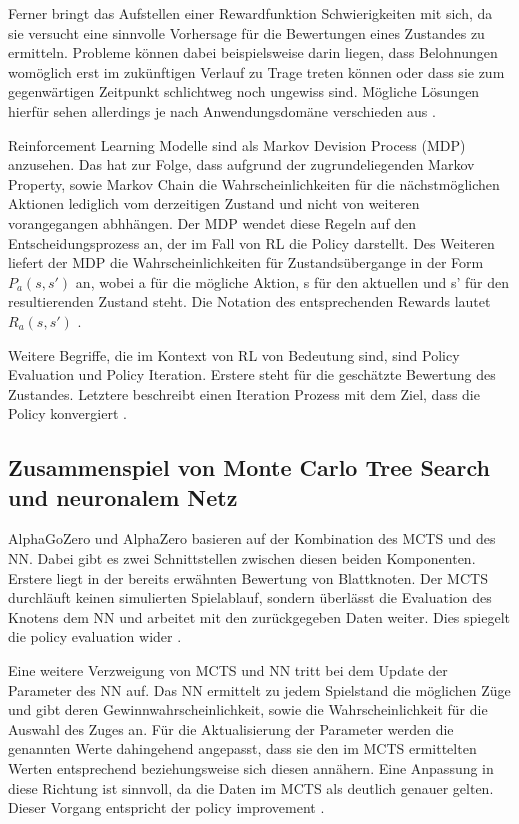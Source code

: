 \documentclass[12pt,a4paper]{article}
\begin{document}
Ferner bringt das Aufstellen einer Rewardfunktion Schwierigkeiten mit sich, da sie versucht eine sinnvolle Vorhersage für die Bewertungen eines Zustandes zu ermitteln. Probleme können dabei beispielsweise darin liegen, dass Belohnungen womöglich erst im zukünftigen Verlauf zu Trage treten können oder dass sie zum gegenwärtigen Zeitpunkt schlichtweg noch ungewiss sind. Mögliche Lösungen hierfür sehen allerdings je nach Anwendungsdomäne verschieden aus \cite[S. 4-7]{Sewak2019}.

Reinforcement Learning Modelle sind als \glqq Markov Devision Process\grqq{} (MDP) anzusehen. Das hat zur Folge, dass aufgrund der zugrundeliegenden \glqq Markov Property, sowie Markov Chain\grqq{} die Wahrscheinlichkeiten für die nächstmöglichen Aktionen lediglich vom derzeitigen Zustand und nicht von weiteren vorangegangen abhhängen. Der MDP wendet diese Regeln auf den Entscheidungsprozess an, der im Fall von RL die Policy darstellt. Des Weiteren liefert der MDP die Wahrscheinlichkeiten für Zustandsübergange in der Form $P_{a}(s, s')$ an, wobei a für die mögliche Aktion, s für den aktuellen und s' für den resultierenden Zustand steht. Die Notation des entsprechenden Rewards lautet $R_{a}(s, s')$ \cite[S. 19f.]{Sewak2019}.

Weitere Begriffe, die im Kontext von RL von Bedeutung sind, sind \glqq{}Policy Evaluation\grqq{} und \glqq{}Policy Iteration\grqq{}. Erstere steht für die geschätzte Bewertung des Zustandes. Letztere beschreibt einen Iteration Prozess mit dem Ziel, dass die Policy konvergiert \cite[S. 27]{Sewak2019}.

\subsection{Zusammenspiel von Monte Carlo Tree Search und neuronalem Netz}
AlphaGoZero und AlphaZero basieren auf der Kombination des MCTS und des NN. Dabei gibt es zwei Schnittstellen zwischen diesen beiden Komponenten. 
Erstere liegt in der bereits erwähnten Bewertung von Blattknoten. Der MCTS durchläuft keinen simulierten Spielablauf, sondern überlässt die Evaluation des Knotens dem NN und arbeitet mit den zurückgegeben Daten weiter. Dies spiegelt die policy evaluation wider \cite{Silver2017}.

Eine weitere Verzweigung von MCTS und NN tritt bei dem Update der Parameter des NN auf. Das NN ermittelt zu jedem Spielstand die möglichen Züge und gibt deren Gewinnwahrscheinlichkeit, sowie die Wahrscheinlichkeit für die Auswahl des Zuges an. Für die Aktualisierung der Parameter werden die genannten Werte dahingehend angepasst, dass sie den im MCTS ermittelten Werten entsprechend beziehungsweise sich diesen annähern. Eine Anpassung in diese Richtung ist sinnvoll, da die Daten im MCTS als deutlich genauer gelten. Dieser Vorgang entspricht der policy improvement \cite{Silver2017}.
\end{document}
